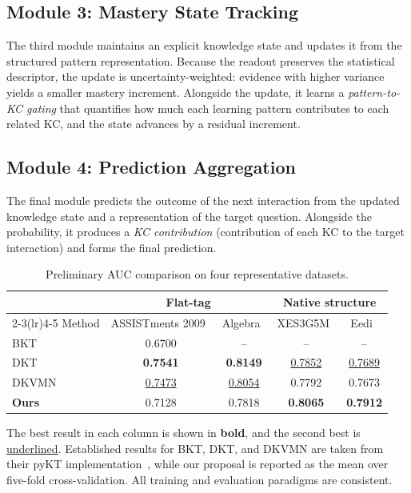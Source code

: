 \documentclass[conference]{IEEEtran}
\begin{document}
\subsection{Module 3: Mastery State Tracking}
\label{sec:mst}

The third module maintains an explicit knowledge state and updates it from the structured pattern representation. Because the readout preserves the statistical descriptor, the update is uncertainty-weighted: evidence with higher variance yields a smaller mastery increment. Alongside the update, it learns a \emph{pattern-to-KC gating} that quantifies how much each learning pattern contributes to each related KC, and the state advances by a residual increment.

\subsection{Module 4: Prediction Aggregation}
\label{sec:pred}

The final module predicts the outcome of the next interaction from the updated knowledge state and a representation of the target question. Alongside the probability, it produces a \emph{KC contribution} (contribution of each KC to the target interaction) and forms the final prediction.

\begin{table}[!t]
\centering
\caption{Preliminary AUC comparison on four representative datasets.}
\label{tab:prelim_results}
\begin{tabular}{lcccc}
\toprule
& \multicolumn{2}{c}{Flat-tag} & \multicolumn{2}{c}{Native structure} \\
\cmidrule(lr){2-3}\cmidrule(lr){4-5}
Method & ASSISTments 2009~\cite{feng2009assistments} & Algebra~\cite{stamper2010kddcup} & XES3G5M~\cite{liu2023xes3g5m} & Eedi~\cite{wang2021neurips} \\
\midrule
BKT~\cite{corbett1994kt}  & 0.6700 & -- & -- & -- \\
DKT~\cite{piech2015dkt} & \textbf{0.7541} & \textbf{0.8149} & \underline{0.7852} & \underline{0.7689} \\
DKVMN~\cite{zhang2017dkvmn} & \underline{0.7473} & \underline{0.8054} & 0.7792 & 0.7673 \\
\textbf{Ours} & 0.7128 & 0.7818 & \textbf{0.8065} & \textbf{0.7912} \\
\bottomrule
\end{tabular}
\begin{flushleft}
\footnotesize
The best result in each column is shown in \textbf{bold}, and the second best is \underline{underlined}. Established results for BKT, DKT, and DKVMN are taken from their pyKT implementation~\cite{zitao2022pykt}, while our proposal is reported as the mean over five-fold cross-validation. All training and evaluation paradigms are consistent.
\end{flushleft}
\end{table}
\end{document}
